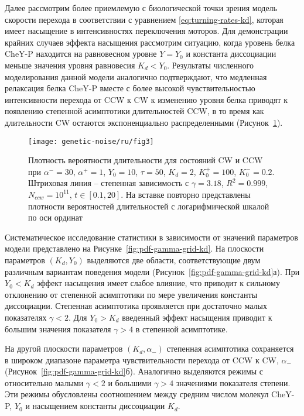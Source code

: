 Далее рассмотрим более приемлемую с биологической точки зрения модель скорости перехода в соответствии с уравнением \cref{eq:turning-rates-kd}, которая имеет насыщение в интенсивностях переключения моторов. Для демонстрации крайних случаев эффекта насыщения рассмотрим ситуацию, когда уровень белка CheY-P находится на равновесном уровне $Y = Y_0$ и константа диссоциации меньше значения уровня равновесия $K_d < Y_0$. Результаты численного моделирования данной модели аналогично подтверждают, что медленная релаксация белка CheY-P вместе с более высокой чувствительностью интенсивности перехода от CCW к CW к изменению уровня белка приводят к появлению степенной асимптотики длительностей CCW, в то время как длительности CW остаются экспоненциально распределенными (Рисунок~\cref{fig:pdf-kd-powerlaw}).

\begin{figure}[ht]
    \centering
    \texttt{[image: genetic-noise/ru/fig3]}
    \caption{
        Плотность вероятности длительности для состояний CW и CCW при $\alpha^- = 30$, $\alpha^+ = 1$, $Y_0 = 10$, $\tau = 50$, $K_d = 2$, $K^+_0 = 100$, $K^-_0 = 0.2$. Штриховая линия -- степенная зависимость с $\gamma = 3.18$, $R^2 = 0.999$, $N_{ccw} = 10^{11}$, $t \in [0.1, 20]$. На вставке повторно представлены плотности вероятностей длительностей с логарифмической шкалой по оси ординат
    }
    \label{fig:pdf-kd-powerlaw}
\end{figure}

Систематическое исследование статистики в зависимости от значений параметров модели представлено на Рисунке~\cref{fig:pdf-gamma-grid-kd}. На плоскости параметров $(K_d, Y_0)$ выделяются две области, соответствующие двум различным вариантам поведения модели (Рисунок~\cref{fig:pdf-gamma-grid-kd}а). При $Y_0 < K_d$ эффект насыщения имеет слабое влияние, что приводит к сильному отклонению от степенной асимптотики по мере увеличения константы диссоциации. Степенная асимптотика проявляется при достаточно малых показателях $\gamma < 2$. Для $Y_0 > K_d$ введенный эффект насыщения приводит к большим значения показателя $\gamma > 4$ в степенной асимптотике. 

На другой плоскости параметров $(K_d, \alpha_-)$ степенная асимптотика сохраняется в широком диапазоне параметра чувствительности перехода от CCW к CW, $\alpha_-$ (Рисунок~\cref{fig:pdf-gamma-grid-kd}б). Аналогично выделяются режимы с относительно малыми $\gamma < 2$ и большими $\gamma > 4$ значениями показателя степени. Эти режимы обусловлены соотношением между средним числом молекул CheY-P, $Y_0$ и насыщением константы диссоциации $K_d$.

